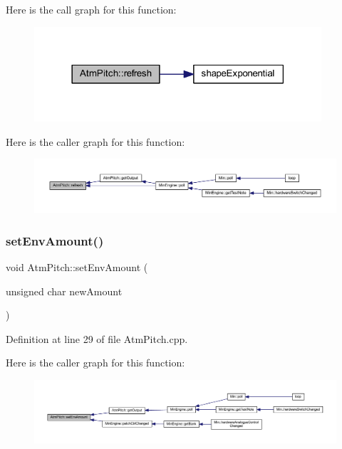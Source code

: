 Here is the call graph for this function\+:
\nopagebreak
\begin{figure}[H]
\begin{center}
\leavevmode
\includegraphics[width=302pt]{dd/d34/class_atm_pitch_a2fc4d9ea4f73818022f9512a656b9572_cgraph}
\end{center}
\end{figure}
Here is the caller graph for this function\+:
\nopagebreak
\begin{figure}[H]
\begin{center}
\leavevmode
\includegraphics[width=350pt]{dd/d34/class_atm_pitch_a2fc4d9ea4f73818022f9512a656b9572_icgraph}
\end{center}
\end{figure}
\mbox{\label{class_atm_pitch_a6e1cbd180ffd94db37eceb4fe95b039b}} 
\subsubsection{\texorpdfstring{set\+Env\+Amount()}{setEnvAmount()}}
{\footnotesize\ttfamily void Atm\+Pitch\+::set\+Env\+Amount (\begin{DoxyParamCaption}\item[{unsigned char}]{new\+Amount }\end{DoxyParamCaption})}



Definition at line 29 of file Atm\+Pitch.\+cpp.

Here is the caller graph for this function\+:
\nopagebreak
\begin{figure}[H]
\begin{center}
\leavevmode
\includegraphics[width=350pt]{dd/d34/class_atm_pitch_a6e1cbd180ffd94db37eceb4fe95b039b_icgraph}
\end{center}
\end{figure}
\mbox{\label{class_atm_pitch_a5e7f1f2581cc25bb966fdfe0c945923d}} 
